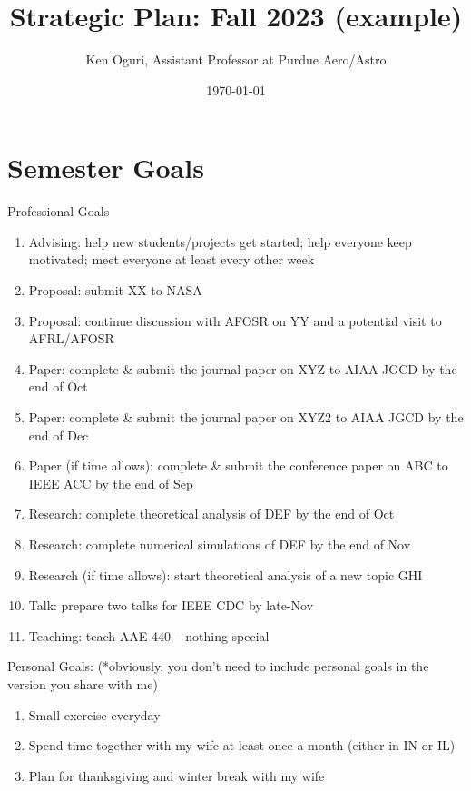 \documentclass{article}
\title{Strategic Plan: Fall 2023 (example)}
\author{Ken Oguri, Assistant Professor at Purdue Aero/Astro}
\date{\today}
\begin{document}
\maketitle

\section{Semester Goals}

\noindent
Professional Goals
\begin{enumerate}
\item 
Advising: help new students/projects get started; help everyone keep motivated; meet everyone at least every other week
\item 
Proposal: submit XX to NASA
\item 
Proposal: continue discussion with AFOSR on YY and a potential visit to AFRL/AFOSR
\item 
Paper: complete \& submit the journal paper on XYZ to AIAA JGCD by the end of Oct
\item 
Paper: complete \& submit the journal paper on XYZ2 to AIAA JGCD by the end of Dec
\item 
Paper (if time allows): complete \& submit the conference paper on ABC to IEEE ACC by the end of Sep
\item 
Research: complete theoretical analysis of DEF by the end of Oct
\item 
Research: complete numerical simulations of DEF by the end of Nov
\item 
Research (if time allows): start theoretical analysis of a new topic GHI
\item 
Talk: prepare two talks for IEEE CDC by late-Nov
\item 
Teaching: teach AAE 440 -- nothing special
\end{enumerate}




\noindent
Personal Goals: 
\hfill (*obviously, you don't need to include personal goals in the version you share with me)
\begin{enumerate}
\item 
Small exercise everyday
\item 
Spend time together with my wife at least once a month (either in IN or IL)
\item 
Plan for thanksgiving and winter break with my wife
\end{enumerate}
\end{document}
